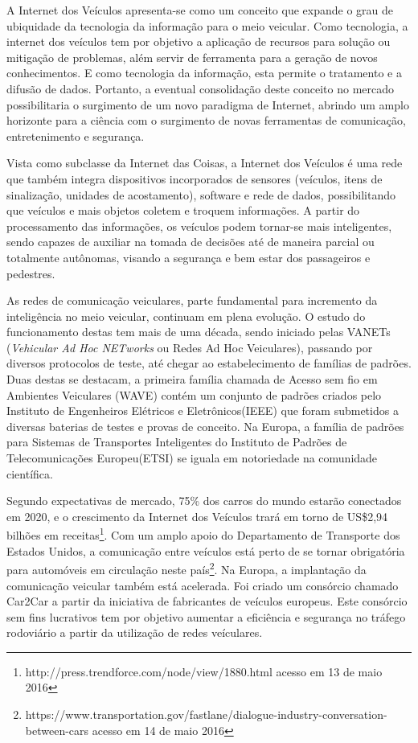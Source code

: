 \documentclass[
12pt,				%
openright,			%
oneside,			%
a4paper,			%
brazil,				%
]{abntex2}
\begin{document}
	\par A Internet dos Veículos apresenta-se como um conceito que expande o grau de ubiquidade da tecnologia da informação para o meio veicular. Como tecnologia, a internet dos veículos tem por objetivo a aplicação de recursos para solução ou mitigação de problemas, além servir de ferramenta para a geração de novos conhecimentos. E como tecnologia da informação, esta permite o tratamento e a difusão de dados. Portanto, a eventual consolidação deste conceito no mercado possibilitaria o surgimento de um novo paradigma de Internet, abrindo um amplo horizonte para a ciência com o surgimento de novas ferramentas de comunicação, entretenimento e segurança.
	
	\par Vista como subclasse da Internet das Coisas, a Internet dos Veículos é uma rede que também integra dispositivos incorporados de sensores (veículos, itens de sinalização, unidades de acostamento), software e rede de dados, possibilitando que veículos e mais objetos coletem e troquem informações. A partir do processamento das informações, os veículos podem tornar-se mais inteligentes, sendo capazes de auxiliar na tomada de decisões até de maneira parcial ou totalmente autônomas, visando a segurança e bem estar dos passageiros e pedestres.
	
	\par As redes de comunicação veiculares, parte fundamental para incremento da inteligência no meio veicular, continuam em plena evolução. O estudo do funcionamento destas tem mais de uma década, sendo iniciado pelas VANETs (\textit{Vehicular Ad Hoc NETworks} ou Redes Ad Hoc Veiculares), passando por diversos protocolos de teste, até chegar ao estabelecimento de famílias de padrões. Duas destas se destacam, a primeira família chamada de Acesso sem fio em Ambientes Veiculares (WAVE) contém um conjunto de padrões criados pelo Instituto de Engenheiros Elétricos e Eletrônicos(IEEE) que foram submetidos a diversas baterias de testes e provas de conceito. Na Europa, a família de padrões para Sistemas de Transportes Inteligentes do Instituto de Padrões de Telecomunicações Europeu(ETSI) se iguala em notoriedade na comunidade científica.
	
	\par Segundo expectativas de mercado, 75\% dos carros do mundo estarão conectados em 2020, e o crescimento da Internet dos Veículos trará em torno de US\$2,94 bilhões em receitas{\footnote{http://press.trendforce.com/node/view/1880.html acesso em 13 de maio 2016}}. Com um amplo apoio do Departamento de Transporte dos Estados Unidos, a comunicação entre veículos está perto de se tornar obrigatória para automóveis em circulação neste país{\footnote{https://www.transportation.gov/fastlane/dialogue-industry-conversation-between-cars acesso em 14 de maio 2016}}. Na Europa, a implantação da comunicação veicular também está acelerada. Foi criado um consórcio chamado Car2Car a partir da iniciativa de fabricantes de veículos europeus. Este consórcio sem fins lucrativos tem por objetivo aumentar a eficiência e segurança no tráfego rodoviário a partir da utilização de redes veículares.
	
\end{document}
